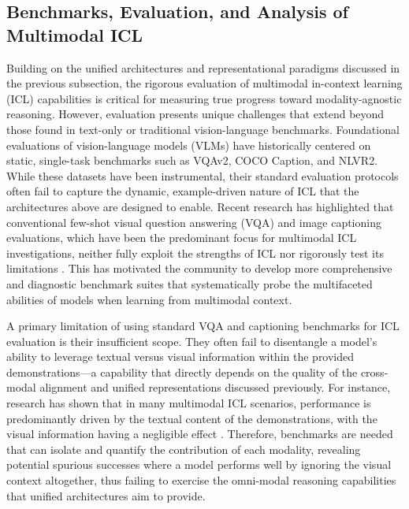 \documentclass[11pt]{article}
\begin{document}
\subsection{Benchmarks, Evaluation, and Analysis of Multimodal ICL}

Building on the unified architectures and representational paradigms discussed in the previous subsection, the rigorous evaluation of multimodal in-context learning (ICL) capabilities is critical for measuring true progress toward modality-agnostic reasoning. However, evaluation presents unique challenges that extend beyond those found in text-only or traditional vision-language benchmarks. Foundational evaluations of vision-language models (VLMs) have historically centered on static, single-task benchmarks such as VQAv2, COCO Caption, and NLVR2. While these datasets have been instrumental, their standard evaluation protocols often fail to capture the dynamic, example-driven nature of ICL that the architectures above are designed to enable. Recent research has highlighted that conventional few-shot visual question answering (VQA) and image captioning evaluations, which have been the predominant focus for multimodal ICL investigations, neither fully exploit the strengths of ICL nor rigorously test its limitations \cite{ref13}. This has motivated the community to develop more comprehensive and diagnostic benchmark suites that systematically probe the multifaceted abilities of models when learning from multimodal context.

A primary limitation of using standard VQA and captioning benchmarks for ICL evaluation is their insufficient scope. They often fail to disentangle a model's ability to leverage textual versus visual information within the provided demonstrations---a capability that directly depends on the quality of the cross-modal alignment and unified representations discussed previously. For instance, research has shown that in many multimodal ICL scenarios, performance is predominantly driven by the textual content of the demonstrations, with the visual information having a negligible effect \cite{ref221}. Therefore, benchmarks are needed that can isolate and quantify the contribution of each modality, revealing potential spurious successes where a model performs well by ignoring the visual context altogether, thus failing to exercise the omni-modal reasoning capabilities that unified architectures aim to provide.
\end{document}

